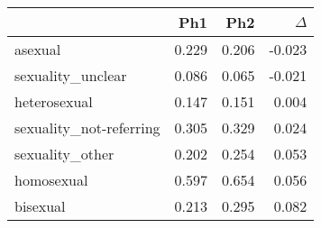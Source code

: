 \begin{tabular}{lrrr}
\toprule
 & Ph1 & Ph2 & $\Delta$ \\
\midrule
asexual & 0.229 & 0.206 & -0.023 \\
sexuality_unclear & 0.086 & 0.065 & -0.021 \\
heterosexual & 0.147 & 0.151 & 0.004 \\
sexuality_not-referring & 0.305 & 0.329 & 0.024 \\
sexuality_other & 0.202 & 0.254 & 0.053 \\
homosexual & 0.597 & 0.654 & 0.056 \\
bisexual & 0.213 & 0.295 & 0.082 \\
\bottomrule
\end{tabular}
